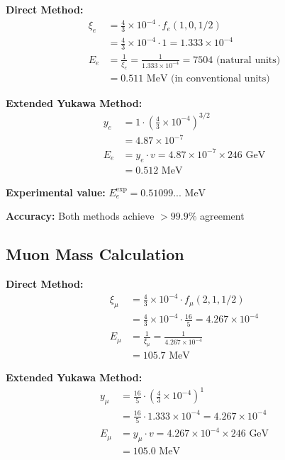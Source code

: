 \documentclass[12pt,a4paper]{article}
\begin{document}
	\textbf{Direct Method:}
	\begin{align}
		\xi_e &= \frac{4}{3} \times 10^{-4} \cdot f_e(1,0,1/2) \\
		&= \frac{4}{3} \times 10^{-4} \cdot 1 = 1.333 \times 10^{-4} \\
		E_{e} &= \frac{1}{\xi_e} = \frac{1}{1.333 \times 10^{-4}} = 7504 \text{ (natural units)} \\
		&= 0.511 \text{ MeV (in conventional units)}
	\end{align}
	
	\textbf{Extended Yukawa Method:}
	\begin{align}
		y_e &= 1 \cdot \left(\frac{4}{3} \times 10^{-4}\right)^{3/2} \\
		&= 4.87 \times 10^{-7} \\
		E_e &= y_e \cdot v = 4.87 \times 10^{-7} \times 246 \text{ GeV} \\
		&= 0.512 \text{ MeV}
	\end{align}
	
	\textbf{Experimental value:} $E_e^{\text{exp}} = 0.51099... \text{ MeV}$
	
	\textbf{Accuracy:} Both methods achieve $> 99.9\%$ agreement
	
	\subsection{Muon Mass Calculation}
	\label{subsec:muon_calculation}
	
	\textbf{Direct Method:}
	\begin{align}
		\xi_\mu &= \frac{4}{3} \times 10^{-4} \cdot f_\mu(2,1,1/2) \\
		&= \frac{4}{3} \times 10^{-4} \cdot \frac{16}{5} = 4.267 \times 10^{-4} \\
		E_{\mu} &= \frac{1}{\xi_\mu} = \frac{1}{4.267 \times 10^{-4}} \\
		&= 105.7 \text{ MeV}
	\end{align}
	
	\textbf{Extended Yukawa Method:}
	\begin{align}
		y_\mu &= \frac{16}{5} \cdot \left(\frac{4}{3} \times 10^{-4}\right)^1 \\
		&= \frac{16}{5} \cdot 1.333 \times 10^{-4} = 4.267 \times 10^{-4} \\
		E_\mu &= y_\mu \cdot v = 4.267 \times 10^{-4} \times 246 \text{ GeV} \\
		&= 105.0 \text{ MeV}
	\end{align}
	
\end{document}
